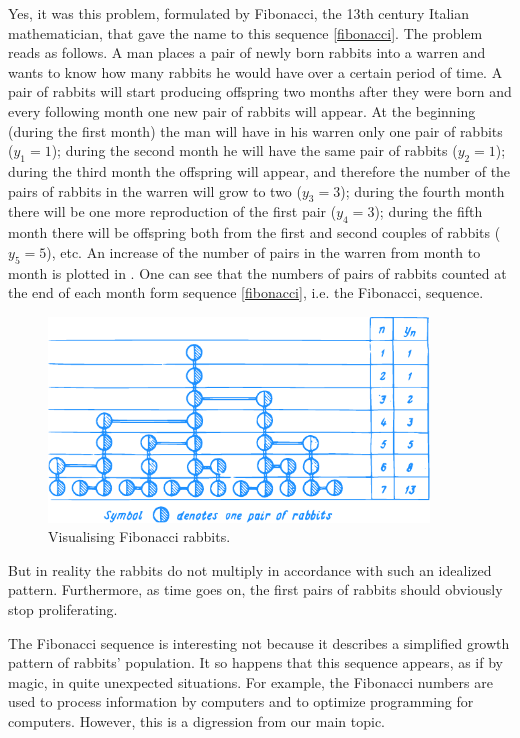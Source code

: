 {\athr Yes, it was this problem, formulated by Fibonacci, the 13th century Italian mathematician, that gave the name to this sequence \eqref{fibonacci}. The problem reads as follows. A man places a pair of newly born rabbits into a warren and wants to know how many rabbits he would have over a certain period of time. A pair of rabbits will start producing offspring two months after they were born and every following month one new pair of rabbits will appear. At the beginning (during the first month) the man will have in his warren only one pair of rabbits ($y_{1} = 1$); during the second month he will have the same pair of rabbits ($y_{2} = 1$); during the third month the offspring will appear, and therefore the number of the pairs of rabbits in the warren will grow to two ($y_{3} = 3$); during the fourth month there will be one more reproduction of the first pair ($y_{4} = 3$); during the fifth month there will be offspring both from the first and second couples of rabbits ($y_{5} = 5$), etc. An increase of the number of pairs in the warren from month to month is plotted in . One can see that the numbers of pairs of rabbits counted at the end of each month form sequence \eqref{fibonacci}, i.e. the Fibonacci, sequence.

\begin{figure}[!h]
\centering
\includegraphics[width=0.9\textwidth]{figures/fig-01.pdf}
\caption{Visualising Fibonacci rabbits.}
\label{fig-01}
\end{figure}

\rdr But in reality the rabbits do not multiply in accordance with such an idealized pattern. Furthermore, as time goes on, the first pairs of rabbits should obviously stop proliferating.

\athr The Fibonacci sequence is interesting not because it describes a simplified growth pattern of rabbits' population. It so happens that this sequence appears, as if by magic, in quite unexpected situations. For example, the Fibonacci numbers are used to process information by computers and to optimize programming for computers. However, this is a digression from our main topic.

}
